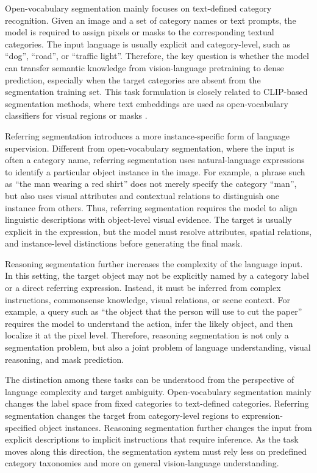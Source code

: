 Open-vocabulary segmentation mainly focuses on text-defined category recognition. 
Given an image and a set of category names or text prompts, the model is required to assign pixels or masks to the corresponding textual categories. 
The input language is usually explicit and category-level, such as ``dog'', ``road'', or ``traffic light''. 
Therefore, the key question is whether the model can transfer semantic knowledge from vision-language pretraining to dense prediction, especially when the target categories are absent from the segmentation training set. 
This task formulation is closely related to CLIP-based segmentation methods, where text embeddings are used as open-vocabulary classifiers for visual regions or masks \cite{Radford2021,Liang2023,Xu2023b}.

Referring segmentation introduces a more instance-specific form of language supervision. 
Different from open-vocabulary segmentation, where the input is often a category name, referring segmentation uses natural-language expressions to identify a particular object instance in the image. 
For example, a phrase such as ``the man wearing a red shirt'' does not merely specify the category ``man'', but also uses visual attributes and contextual relations to distinguish one instance from others. 
Thus, referring segmentation requires the model to align linguistic descriptions with object-level visual evidence. 
The target is usually explicit in the expression, but the model must resolve attributes, spatial relations, and instance-level distinctions before generating the final mask.

Reasoning segmentation further increases the complexity of the language input. 
In this setting, the target object may not be explicitly named by a category label or a direct referring expression. 
Instead, it must be inferred from complex instructions, commonsense knowledge, visual relations, or scene context. 
For example, a query such as ``the object that the person will use to cut the paper'' requires the model to understand the action, infer the likely object, and then localize it at the pixel level. 
Therefore, reasoning segmentation is not only a segmentation problem, but also a joint problem of language understanding, visual reasoning, and mask prediction.

The distinction among these tasks can be understood from the perspective of language complexity and target ambiguity. 
Open-vocabulary segmentation mainly changes the label space from fixed categories to text-defined categories. 
Referring segmentation changes the target from category-level regions to expression-specified object instances. 
Reasoning segmentation further changes the input from explicit descriptions to implicit instructions that require inference. 
As the task moves along this direction, the segmentation system must rely less on predefined category taxonomies and more on general vision-language understanding.


